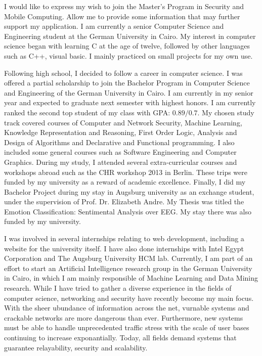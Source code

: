 \documentclass[10pt,stdletter,dateno,sigleft]{newlfm} %
\begin{document}
\begin{newlfm}


  I would like to express my wish to join the Master's Program in Security and
  Mobile Computing. Allow me to provide some information that may further support my application.
  I am currently a senior Computer Science and Engineering student at the German
  University in Cairo.  My interest in computer science began with learning C at the age of twelve,
  followed by other languages such as C++, visual basic. I mainly practiced on
  small projects for my own use.  

  Following high school, I decided to follow a career in computer science. I was
  offered a partial scholarship to join the Bachelor Program in Computer Science
  and Engineering of the German University in Cairo. I am currently in my senior
  year and expected to graduate next semester with highest honors. I am
  currently ranked the second top student of my class with GPA: $0.89/0.7$. My
  chosen study track covered courses of Computer and Network Security, Machine Learning, Knowledge
  Representation and Reasoning, First Order Logic, Analysis and Design of
  Algorithms and Declarative and Functional
  programming. I also included some general courses such as Software Engineering
  and Computer Graphics. During my study, I attended several extra-curricular courses and
  workshops abroad such as the CHR workshop 2013 in Berlin. These trips were
  funded by my university as a reward of academic excellence. Finally, I did my
  Bachelor Project during my stay in Augsburg university as an exchange student,
  under the supervision of Prof. Dr. Elizabeth Andre. My Thesis was titled the
  Emotion Classification: Sentimental Analysis over EEG. My stay there was also
  funded by my university.

  I was involved in several internships relating to web development,
  including a website for the university itself. I have also done internships
  with Intel Egypt Corporation and The Augsburg University HCM lab. Currently,
  I am part of an effort to start an Artificial
  Intelligence research group in the German University in Cairo, in which I am
  mainly responsible of Machine Learning and Data Mining research. While I have
  tried to gather a diverse experience in the fields of computer science,
  networking and security have recently become my main focus. With the sheer
  ubundance of information across the net, vurnable systems and crackable
  networks are more dangerous than ever. Furthermore, new systems must be able
  to handle unprecedented traffic stress with the scale of user bases continuing
  to increase exponantially. Today, all fields demand systems that
  guarantee relayability, security and scalability. 


\end{newlfm}
\end{document}
